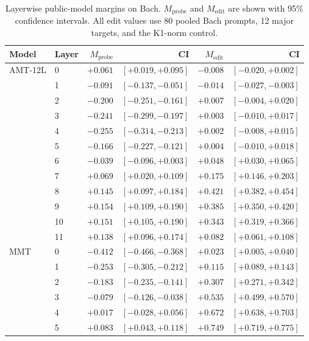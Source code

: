 \begin{table}[!t]
\centering
\tabfont
\caption{Layerwise public-model margins on Bach.
$M_{\mathrm{probe}}$ and $M_{\mathrm{edit}}$ are shown with 95\% confidence intervals.
All edit values use 80 pooled Bach prompts, 12 major targets, and the K1-norm control.}
\label{tab:public-layerwise}
\setlength{\tabcolsep}{4pt}
\begin{tabular}{@{}llrrrr@{}}
\toprule
Model & Layer & $M_{\mathrm{probe}}$ & CI & $M_{\mathrm{edit}}$ & CI \\
\midrule
AMT-12L & 0 & $+0.061$ & $[+0.019, +0.095]$ & $-0.008$ & $[-0.020, +0.002]$ \\
 & 1 & $-0.091$ & $[-0.137, -0.051]$ & $-0.014$ & $[-0.027, -0.003]$ \\
 & 2 & $-0.200$ & $[-0.251, -0.161]$ & $+0.007$ & $[-0.004, +0.020]$ \\
 & 3 & $-0.241$ & $[-0.299, -0.197]$ & $+0.003$ & $[-0.010, +0.017]$ \\
 & 4 & $-0.255$ & $[-0.314, -0.213]$ & $+0.002$ & $[-0.008, +0.015]$ \\
 & 5 & $-0.166$ & $[-0.227, -0.121]$ & $+0.004$ & $[-0.010, +0.018]$ \\
 & 6 & $-0.039$ & $[-0.096, +0.003]$ & $+0.048$ & $[+0.030, +0.065]$ \\
 & 7 & $+0.069$ & $[+0.020, +0.109]$ & $+0.175$ & $[+0.146, +0.203]$ \\
 & 8 & $+0.145$ & $[+0.097, +0.184]$ & $+0.421$ & $[+0.382, +0.454]$ \\
 & 9 & $+0.154$ & $[+0.109, +0.190]$ & $+0.385$ & $[+0.350, +0.420]$ \\
 & 10 & $+0.151$ & $[+0.105, +0.190]$ & $+0.343$ & $[+0.319, +0.366]$ \\
 & 11 & $+0.138$ & $[+0.096, +0.174]$ & $+0.082$ & $[+0.061, +0.108]$ \\
\addlinespace[2pt]
MMT & 0 & $-0.412$ & $[-0.466, -0.368]$ & $+0.023$ & $[+0.005, +0.040]$ \\
 & 1 & $-0.253$ & $[-0.305, -0.212]$ & $+0.115$ & $[+0.089, +0.143]$ \\
 & 2 & $-0.183$ & $[-0.235, -0.141]$ & $+0.307$ & $[+0.271, +0.342]$ \\
 & 3 & $-0.079$ & $[-0.126, -0.038]$ & $+0.535$ & $[+0.499, +0.570]$ \\
 & 4 & $+0.017$ & $[-0.028, +0.056]$ & $+0.672$ & $[+0.638, +0.703]$ \\
 & 5 & $+0.083$ & $[+0.043, +0.118]$ & $+0.749$ & $[+0.719, +0.775]$ \\

\end{tabular}
\end{table}
